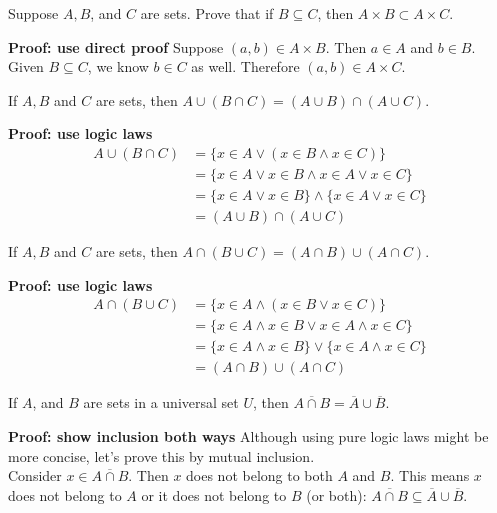 \documentclass{article}
\begin{document}
\begin{problem}
Suppose $A, B$, and $C$ are sets. Prove that if $B \subseteq C$, then $A \times B \subset A \times C$.
\end{problem}
\textbf{Proof: use direct proof}
Suppose $(a, b) \in A \times B$. Then $a \in A$ and $b \in B$. Given $B \subseteq C$, we know $b \in C$ as well. Therefore $(a, b) \in A \times C$.

\begin{problem}
If $A, B$ and $C$ are sets, then $A \cup (B \cap C) = (A \cup B) \cap (A \cup C)$.
\end{problem}
\textbf{Proof: use logic laws}
\begin{align*}
  A \cup (B \cap C) & = \{x \in A \lor (x \in B \land x \in C)\}                \\
                    & = \{x \in A \lor x \in B \land x \in A \lor x \in C\}     \\
                    & = \{x \in A \lor x \in B\} \land \{x \in A \lor x \in C\} \\
                    & = (A \cup B) \cap (A \cup C)
\end{align*}

\begin{problem}
If $A, B$ and $C$ are sets, then $A \cap (B \cup C) = (A \cap B) \cup (A \cap C)$.
\end{problem}
\textbf{Proof: use logic laws}
\begin{align*}
  A \cap (B \cup C) & = \{x \in A \land (x \in B \lor x \in C)\}                 \\
                    & = \{x \in A \land x \in B \lor x \in A \land x \in C\}     \\
                    & = \{x \in A \land x \in B\} \lor \{x \in A \land x \in C\} \\
                    & = (A \cap B) \cup (A \cap C)
\end{align*}

\begin{problem}
If $A$, and $B$ are sets in a universal set $U$, then $\overline{A \cap B} = \overline{A} \cup \overline{B}$.
\end{problem}
\textbf{Proof: show inclusion both ways}
Although using pure logic laws might be more concise, let's prove this by mutual inclusion.
\\

Consider $x \in \overline{A \cap B}$. Then $x$ does not belong to both $A$ and $B$. This means $x$ does not belong to $A$ or it does not belong to $B$ (or both): $\overline{A \cap B} \subseteq \overline{A} \cup \overline{B}$.
\\
\end{document}
